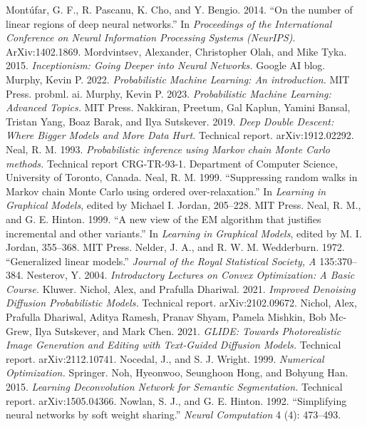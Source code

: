  Mont\'ufar, G. F., R. Pascanu, K. Cho, and Y. Bengio. 2014. ``On the number of linear regions of deep neural networks.'' In \emph{Proceedings of the International Conference on Neural Information Processing Systems (NeurIPS)}. ArXiv:1402.1869.
 Mordvintsev, Alexander, Christopher Olah, and Mike Tyka. 2015. \emph{Inceptionism: Going Deeper into Neural Networks.} Google AI blog.
 Murphy, Kevin P. 2022. \emph{Probabilistic Machine Learning: An introduction.} MIT Press. probml. ai.
 Murphy, Kevin P. 2023. \emph{Probabilistic Machine Learning: Advanced Topics.} MIT Press.
 Nakkiran, Preetum, Gal Kaplun, Yamini Bansal, Tristan Yang, Boaz Barak, and Ilya Sutskever. 2019. \emph{Deep Double Descent: Where Bigger Models and More Data Hurt.} Technical report. arXiv:1912.02292.
 Neal, R. M. 1993. \emph{Probabilistic inference using Markov chain Monte Carlo methods.} Technical report CRG-TR-93-1. Department of Computer Science, University of Toronto, Canada.
 Neal, R. M. 1999. ``Suppressing random walks in Markov chain Monte Carlo using ordered over-relaxation.'' In \emph{Learning in Graphical Models}, edited by Michael I. Jordan, 205--228. MIT Press.
 Neal, R. M., and G. E. Hinton. 1999. ``A new view of the EM algorithm that justifies incremental and other variants.'' In \emph{Learning in Graphical Models}, edited by M. I. Jordan, 355--368. MIT Press.
 Nelder, J. A., and R. W. M. Wedderburn. 1972. ``Generalized linear models.'' \emph{Journal of the Royal Statistical Society, A} 135:370--384.
 Nesterov, Y. 2004. \emph{Introductory Lectures on Convex Optimization: A Basic Course.} Kluwer.
 Nichol, Alex, and Prafulla Dhariwal. 2021. \emph{Improved Denoising Diffusion Probabilistic Models.} Technical report. arXiv:2102.09672.
 Nichol, Alex, Prafulla Dhariwal, Aditya Ramesh, Pranav Shyam, Pamela Mishkin, Bob Mc-Grew, Ilya Sutskever, and Mark Chen. 2021. \emph{GLIDE: Towards Photorealistic Image Generation and Editing with Text-Guided Diffusion Models.} Technical report. arXiv:2112.10741.
 Nocedal, J., and S. J. Wright. 1999. \emph{Numerical Optimization.} Springer.
 Noh, Hyeonwoo, Seunghoon Hong, and Bohyung Han. 2015. \emph{Learning Deconvolution Network for Semantic Segmentation.} Technical report. arXiv:1505.04366.
 Nowlan, S. J., and G. E. Hinton. 1992. ``Simplifying neural networks by soft weight sharing.'' \emph{Neural Computation} 4 (4): 473--493.

